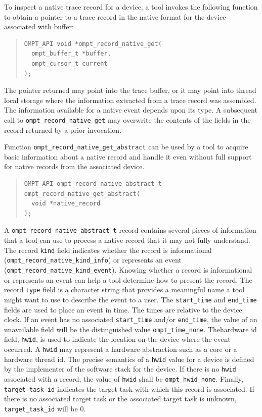 \documentclass{article}
\begin{document}
To inspect a native trace record for a device, a tool invokes the following function to obtain a pointer to a trace record in the native format for the device associated with buffer:
\begin{quote}
\begin{verbatim}
OMPT_API void *ompt_record_native_get(
  ompt_buffer_t *buffer, 
  ompt_cursor_t current
);
\end{verbatim}
\end{quote}
The pointer returned  may point into the trace buffer, or it may point into thread local storage where the information extracted from a trace record was assembled. The information available for a native event depends upon its type. 
A subsequent call to \verb|ompt_record_native_get| may overwrite the contents of the fields in the record returned by a prior invocation.

Function  \verb|ompt_record_native_get_abstract| can be used by a tool to acquire basic information about a native record and handle it even without full support for  native records from the associated device.
\begin{quote}
\begin{verbatim}
OMPT_API ompt_record_native_abstract_t ompt_record_native_get_abstract(
  void *native_record 
);

\end{verbatim}
\end{quote}
A  \verb|ompt_record_native_abstract_t| record contains several pieces of information that a tool can use to process a native record that it may not fully understand. The record \verb|kind| field indicates whether the record is informational (\verb|ompt_record_native_kind_info|) or represents an event (\verb|ompt_record_native_kind_event|). Knowing whether a record is informational or represents an event can help a tool determine how to present the record. The record  \verb|type| field is a character string that provides  a meaningful name  a tool might want to use to describe the event to a user. The \verb|start_time| and \verb|end_time| fields are used to place an event in time. The times are relative to the device clock. If an event has no associated \verb|start_time| and/or \verb|end_time|, the value of an unavailable field will be the distinguished value \verb|ompt_time_none|. Thehardware id field, \verb|hwid|,  is used to indicate the location on the device where the event occurred. A \verb|hwid| may represent a hardware abstraction such as a core or a hardware thread id. The precise semantics of a \verb|hwid| value for a device is defined by the implementer of the software stack for the device. If there is no \verb|hwid| associated with a record, the value of \verb|hwid| shall be \verb|ompt_hwid_none|. Finally, \verb|target_task_id| indicates the target task with which this record is associated. If there is no associated target task or the associated target task is unknown,  \verb|target_task_id|  will be  0.
\end{document}
